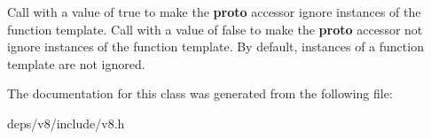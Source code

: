 Call with a value of true to make the {\bfseries proto} accessor ignore instances of the function template. Call with a value of false to make the {\bfseries proto} accessor not ignore instances of the function template. By default, instances of a function template are not ignored. 

The documentation for this class was generated from the following file\+:\begin{DoxyCompactItemize}
\item 
deps/v8/include/v8.\+h\end{DoxyCompactItemize}
